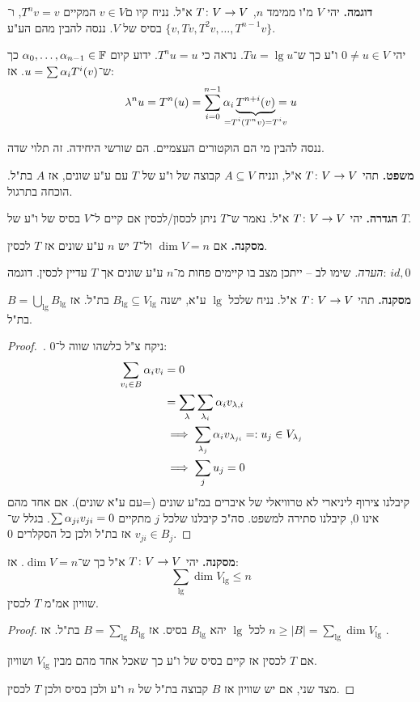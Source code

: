 \documentclass[]{../../../../tex/classes/styledArticle}
\begin{document}
	\textbf{דוגמה.}
	יהי $V$ מ"ו ממימד $n$, $T \colon V \to V$ א"ל. נניח קיו ם$v \in V $ המקיים $T^nv = v$, ו־$\{v, Tv, T^2v, \dots, T^{n - 1}v\}$ בסיס של $V$. ננסה להבין מהם הע"ע. 
	
	יהי $0 \neq u \in V$ ו"ע כך ש־$Tu = \lg u$. נראה כי $T^nu = u$. ידוע קיום $\alpha_0, \dots, \alpha_{n - 1} \in \mathbb{F}$ כך ש־$u = \sum \alpha_iT^i(v)$. אז: 
	\[ \lg^nu = T^n(u) = \sum_{i = 0}^{n - 1}\ag_i\underbrace{T^{n + i}(v)}_{\mathclap{= T^i(T^nv) = T^iv}} = u \]
	
	ננסה להבין מי הם הוקטורים העצמיים. הם שורשי היחידה. זה תלוי שדה. 
	
	\textbf{משפט. }תהי $T \colon V \to V$ א"ל, ונניח $A \subseteq V$ קבוצה של ו"ע של $T$ עם ע"ע שונים, אז $A$ בת"ל. הוכחה בתרגול. 
	
	\textbf{הגדרה. }יהי $T \colon V \to V$ א"ל. נאמר ש־$T$ ניתן לכסון/לכסין אם קיים ל־$V$ בסיס של ו"ע של $T$. 
	
	\textbf{מסקנה. }אם $\dim V = n$ ול־$T$ יש $n$ ע"ע שונים אז $T$ לכסין. 
	
	\textit{הערה. }שימו לב – ייתכן מצב בו קיימים פחות מ־$n$ ע"ע שונים אך $T$ עדיין לכסין. דוגמה: $id, 0$
	
	\textbf{מסקנה. }תהי $T \colon V \to V$ א"ל. נניח שלכל $\lg$ ע"א, ישנה $B_\lg \subseteq V_\lg$ בת"ל. אז $B = \bigcup_{\lg}B_\lg$ בת"ל. 
	
	\begin{proof}\,\!. ניקח צ"ל כלשהו שווה ל־0: 
		\begin{align*}
			\sum_{v_i \in B} \alpha_iv_i &= 0 \\
			&= \sum_{\lambda}\sum_{\lambda_i}\alpha_iv_{\lambda, i} \\
			&\implies \sum_{\lambda_j}\alpha_i v_{\lambda_{ji}} =: u_j \in V_{\lambda_j} \\
			&\implies \sum_{j}u_j = 0
		\end{align*}
			קיבלנו צירוף ליניארי לא טרוויאלי של איברים במ"ע שונים (=עם ע"א שונים). אם אחד מהם אינו 0, קיבלנו סתירה למשפט. סה"כ קיבלנו שלכל $j$ מתקיים $\sum \alpha_{ji}v_{ji} = 0$. בגלל ש־$v_{ji} \in B_j$ אז בת"ל ולכן כל הסקלרים 0. 
	\end{proof}

	\textbf{מסקנה. }יהי $T \colon V \to V$ א"ל כך ש־$\dim V = n$. אז: 
	\[ \sum_\lg \dim V_\lg \le n \]
	שוויון אמ"מ $T$ לכסין. 
	
	\begin{proof}
		לכל $\lg$ יהא $B_\lg$ בסיס. אז $B = \sum_{\lg}B_\lg$ בת"ל. אז $n \ge |B| = \sum_\lg \dim V_\lg$ . 
		
		אם $T$ לכסין אז קיים בסיס של ו"ע כך שאכל אחד מהם מבין $V_\lg$ ושוויון. 
		
		מצד שני, אם יש שוויון אז $B$ קבוצה בת"ל של $n$ ו"ע ולכן בסיס ולכן $T$ לכסין. 
	\end{proof}
	
\end{document}
